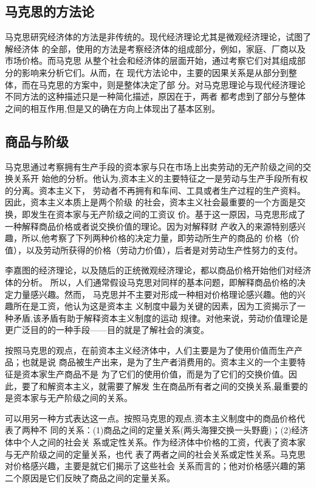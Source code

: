 \subsection{马克思的方法论}

马克思研究经济体的方法是非传统的。现代经济理论尤其是微观经济理论，试图了解经济体
的全部，使用的方法是考察经济体的组成部分，例如，家庭、厂商以及市场价格。而马克思
从整个社会和经济体的层面开始，通过考察它们对其组成部分的影响来分析它们。从而，在
现代方法论中，主要的因果关系是从部分到整体，而在马克思的方案中，则是整体决定了部
分。对马克思理论与现代经济理论不同方法的这种描述只是一种简化描述，原因在于，两者
都考虑到了部分与整体之间的相互作用,但是又的确在方向上体现出了基本区别。

\subsection{商品与阶级}

马克思通过考察拥有生产手段的资本家与只在市场上出卖劳动的无产阶级之间的交换关系开
始他的分析。他认为,资本主义的主要特征之一是劳动与生产手段所有权的分离。资本主义下，
劳动者不再拥有和车间、工具或者生产过程的生产资料。因此，资本主义本质上是两个阶级
的社会，资本主义社会最重要的一个方面是交换，即发生在资本家与无产阶级之间的工资议
价。基于这一原因，马克思形成了一种解释商品价格或者说交换价值的理论。因为对解释财
产收入的来源特别感兴趣，所以,他考察了下列两种价格的决定力量，即劳动所生产的商品的
价格（价值），以及劳动所获得的价格（劳动力价值），后者是对劳动生产性努力的支付。

李嘉图的经济理论，以及随后的正统微观经济理论，都以商品价格开始他们对经济体的分析。
所以，人们通常假设马克思对同样的基本问题，即解释商品价格的决定力量感兴趣。然而，
马克思并不主要对形成一种相对价格理论感兴趣。他的兴趣所在是工资，他认为这是资本主
义制度中最为关键的因素，因为工资揭示了一种矛盾,该矛盾有助于解释资本主义制度的运动
规律。对他来说，劳动价值理论是更广泛目的的一种手段——目的就是了解社会的演变。

按照马克思的观点，在前资本主义经济体中，人们主要是为了使用价值而生产产品；也就是说
商品被生产出来，是为了生产者消费用的。资本主义的一个主要特征是资本家生产商品不是
为了它们的使用价值，而是为了它们的交换价值。因此，要了和解资本主义，就需要了解发
生在商品所有者之间的交换关系,最重要的是资本家与无产阶级之间的关系。

可以用另一种方式表达这一点。按照马克思的观点,资本主义制度中的商品价格代表了两种不
同的关系：(1)商品之间的定量关系(两头海狸交换一头野鹿)；(2)经济体中个人之间的社会关
系或定性关系。作为经济体中价格的工资，代表了资本家与无产阶级之间的定量关系，也代
表了两者之间的社会关系或定性关系。马克思对价格感兴趣，主要是就它们揭示了这些社会
关系而言的；他对价格感兴趣的第二个原因是它们反映了商品之间的定量关系。


